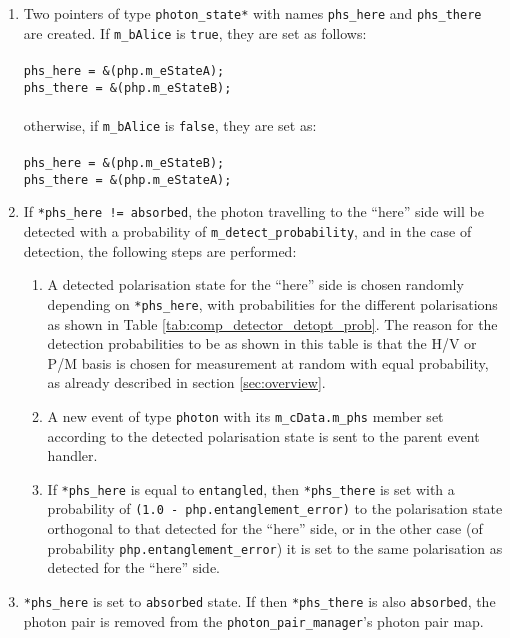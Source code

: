 \begin{enumerate}

\item Two pointers of type \texttt{photon\_state*} with names \texttt{phs\_here} and \texttt{phs\_there} are created. If \texttt{m\_bAlice} is \texttt{true}, they are set as follows:\\
\\
\texttt{phs\_here = \&(php.m\_eStateA);\\
phs\_there = \&(php.m\_eStateB);}\\
\\
otherwise, if \texttt{m\_bAlice} is \texttt{false}, they are set as:\\
\\
\texttt{phs\_here = \&(php.m\_eStateB);\\
phs\_there = \&(php.m\_eStateA);}\\

\item If \texttt{*phs\_here != absorbed}, the photon travelling to the ``here'' side will be detected with a probability of \texttt{m\_detect\_probability}, and in the case of detection, the following steps are performed:

\begin{enumerate}

\item A detected polarisation state for the ``here'' side is chosen randomly depending on \texttt{*phs\_here}, with probabilities for the different polarisations as shown in Table \ref{tab:comp_detector_detopt_prob}. The reason for the detection probabilities to be as shown in this table is that the H/V or P/M basis is chosen for measurement at random with equal probability, as already described in section \ref{sec:overview}.

\item A new event of type \texttt{photon} with its \texttt{m\_cData.m\_phs} member set according to the detected polarisation state is sent to the parent event handler.

\item If \texttt{*phs\_here} is equal to \texttt{entangled}, then \texttt{*phs\_there} is set with a probability of \texttt{(1.0 - php.entanglement\_error)} to the polarisation state orthogonal to that detected for the ``here'' side, or in the other case (of probability \texttt{php.entanglement\_error}) it is set to the same polarisation as detected for the ``here'' side.

\end{enumerate}

\item \texttt{*phs\_here} is set to \texttt{absorbed} state. If then \texttt{*phs\_there} is also \texttt{absorbed}, the photon pair is removed from the \texttt{photon\_pair\_manager}'s photon pair map.

\end{enumerate}

